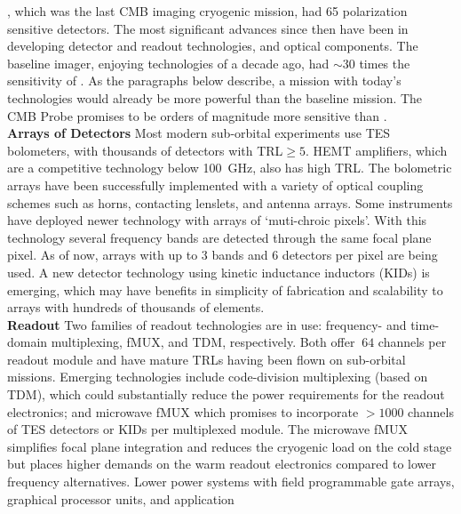 \planck, which was the last CMB imaging cryogenic mission, had 65 polarization sensitive detectors. 
The most significant advances since then have been in developing detector and readout technologies, and optical components.
The baseline imager, enjoying technologies of a decade ago, had $\sim$30 times the sensitivity of \planck.  
As the paragraphs below describe, a mission with today's technologies would already be 
more powerful than the baseline mission.  The CMB Probe promises to be orders of magnitude more 
sensitive than \planck.  \\
{\bf Arrays of Detectors} \hspace{0.1in} 
Most modern sub-orbital experiments use TES bolometers, with thousands of detectors with TRL$\geq 5$. 
HEMT amplifiers, which are a competitive technology below 100~GHz, also has high TRL.   
The bolometric arrays have been successfully implemented with a variety of optical coupling schemes such as horns, 
contacting lenslets, and antenna arrays. Some instruments have deployed newer technology with arrays of `muti-chroic pixels'. 
With this technology several frequency bands are detected through the same focal plane pixel. As of now, arrays with up 
to 3 bands and 6 detectors per pixel are being used. 
A new detector 
technology using kinetic inductance inductors (KIDs) is emerging, which may have benefits in simplicity of fabrication and 
scalability to arrays with hundreds of thousands of elements.  \\
{\bf Readout }  \hspace{0.1in} Two families of readout technologies are in use: frequency- and time-domain multiplexing, 
fMUX, and TDM, respectively.  Both offer $~64$ channels per readout module and have mature TRLs having been 
flown on sub-orbital missions.   Emerging technologies include code-division multiplexing (based on TDM), which could 
substantially reduce the power requirements for the readout electronics; and microwave fMUX which promises to 
incorporate $>1000$ channels of TES detectors or KIDs per multiplexed module. The microwave fMUX simplifies 
focal plane integration and reduces the cryogenic load on the cold stage but places higher 
demands on the warm readout electronics compared to lower frequency alternatives. 
Lower power systems with field programmable gate arrays, graphical processor units, and application 
